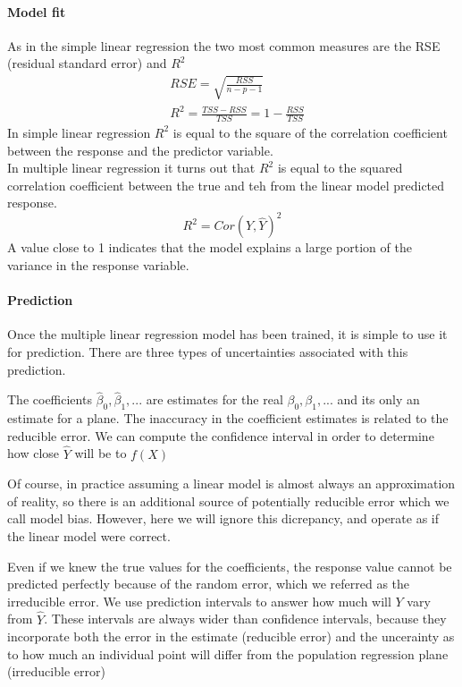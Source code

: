 \documentclass[../document.tex]{subfiles}
\begin{document}
	\paragraph{Model fit}
	As in the simple linear regression the two most common measures are the RSE (residual standard error) and \(R^2\)
	\begin{equation}
	\begin{split}
		&RSE = \sqrt{\frac{RSS}{n-p-1}}\\
		&R^2 = \frac{TSS-RSS}{TSS}=1-\frac{RSS}{TSS}
	\end{split}
	\end{equation}
	In simple linear regression \(R^2\) is equal to the square of the correlation coefficient between the response and the predictor variable.\\
	In multiple linear regression it turns out that \(R^2\) is equal to the squared correlation coefficient between the true and teh from the linear model predicted response.
	\begin{equation}
		R^2=Cor(Y,\hat{Y})^2
	\end{equation}
	A value close to 1 indicates that the model explains a large portion of the variance in the response variable.
	\paragraph{Prediction}
	Once the multiple linear regression model has been trained, it is simple to use it for prediction. There are three types of uncertainties associated with this prediction.
	\begin{description}
		\item The coefficients \(\hat{\beta}_{0},\hat{\beta}_{1},...\) are estimates for the real \(\beta_{0},\beta_{1},...\) and its only an estimate for a plane. The inaccuracy in the coefficient estimates is related to the reducible error. We can compute the confidence interval in order to determine how close \(\hat{Y}\) will be to \(f(X)\)
		\item Of course, in practice assuming a linear model is almost always an approximation of reality, so there is an additional source of potentially reducible error which we call model bias. However, here we will ignore this dicrepancy, and operate as if the linear model were correct.
		\item Even if we knew the true values for the coefficients, the response value cannot be predicted perfectly because of the random error, which we referred as the irreducible error. We use prediction intervals to answer how much will \(Y\) vary from \(\hat{Y}\). These intervals are always wider than confidence intervals, because they incorporate both the error in the estimate (reducible error) and the uncerainty as to how much an individual point will differ from the population regression plane (irreducible error)
	\end{description}
\end{document}

